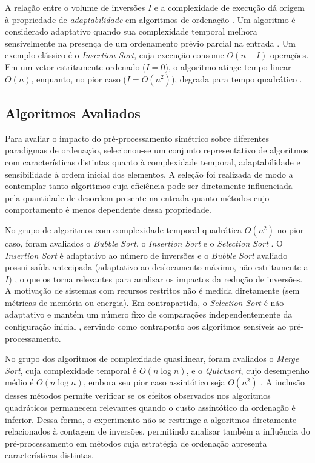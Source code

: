 \documentclass[portuguese]{sbc2025}%
\begin{document}
A relação entre o volume de inversões $I$ e a complexidade de execução dá origem à propriedade de \emph{adaptabilidade} em algoritmos de ordenação \citep{estivill-castro_survey_1992}. Um algoritmo é considerado adaptativo quando sua complexidade temporal melhora sensivelmente na presença de um ordenamento prévio parcial na entrada \citep{mannila_measures_1984}. Um exemplo clássico é o \emph{Insertion Sort}, cuja execução consome $O(n + I)$ operações. Em um vetor estritamente ordenado ($I = 0$), o algoritmo atinge tempo linear $O(n)$, enquanto, no pior caso ($I = O(n^2)$), degrada para tempo quadrático \citep{cormen_introduction_2022, knuth_art_1973}.

\subsection{Algoritmos Avaliados}

Para avaliar o impacto do pré-processamento simétrico sobre diferentes paradigmas de ordenação, selecionou-se um conjunto representativo de algoritmos com características distintas quanto à complexidade temporal, adaptabilidade e sensibilidade à ordem inicial dos elementos. A seleção foi realizada de modo a contemplar tanto algoritmos cuja eficiência pode ser diretamente influenciada pela quantidade de desordem presente na entrada quanto métodos cujo comportamento é menos dependente dessa propriedade.

No grupo de algoritmos com complexidade temporal quadrática $O(n^2)$ no pior caso, foram avaliados o \emph{Bubble Sort}, o \emph{Insertion Sort} e o \emph{Selection Sort} \citep{cormen_introduction_2022}. O \emph{Insertion Sort} é adaptativo ao número de inversões e o \emph{Bubble Sort} avaliado possui saída antecipada (adaptativo ao deslocamento máximo, não estritamente a $I$) \citep{estivill-castro_survey_1992}, o que os torna relevantes para analisar os impactos da redução de inversões. A motivação de sistemas com recursos restritos não é medida diretamente (sem métricas de memória ou energia). Em contrapartida, o \emph{Selection Sort} é não adaptativo e mantém um número fixo de comparações independentemente da configuração inicial \citep{estivill-castro_survey_1992}, servindo como contraponto aos algoritmos sensíveis ao pré-processamento.

No grupo dos algoritmos de complexidade quasilinear, foram avaliados o \emph{Merge Sort}, cuja complexidade temporal é $O(n\log n)$, e o \emph{Quicksort}, cujo desempenho médio é $O(n\log n)$, embora seu pior caso assintótico seja $O(n^2)$ \citep{cormen_introduction_2022}. A inclusão desses métodos permite verificar se os efeitos observados nos algoritmos quadráticos permanecem relevantes quando o custo assintótico da ordenação é inferior. Dessa forma, o experimento não se restringe a algoritmos diretamente relacionados à contagem de inversões, permitindo analisar também a influência do pré-processamento em métodos cuja estratégia de ordenação apresenta características distintas.
\end{document}
